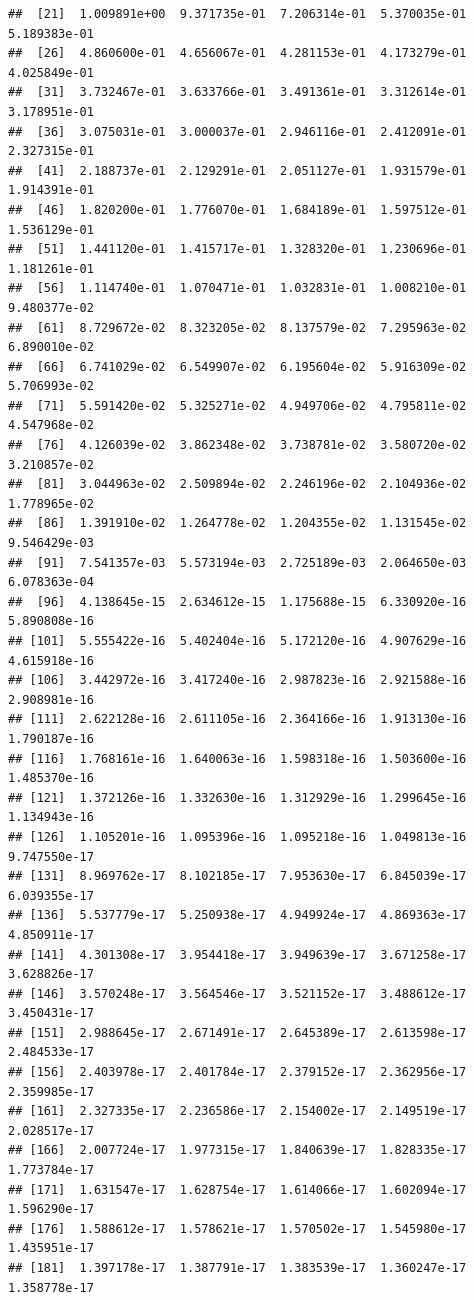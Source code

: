 \documentclass[]{article}
\begin{document}
\begin{verbatim}
##  [21]  1.009891e+00  9.371735e-01  7.206314e-01  5.370035e-01  5.189383e-01
##  [26]  4.860600e-01  4.656067e-01  4.281153e-01  4.173279e-01  4.025849e-01
##  [31]  3.732467e-01  3.633766e-01  3.491361e-01  3.312614e-01  3.178951e-01
##  [36]  3.075031e-01  3.000037e-01  2.946116e-01  2.412091e-01  2.327315e-01
##  [41]  2.188737e-01  2.129291e-01  2.051127e-01  1.931579e-01  1.914391e-01
##  [46]  1.820200e-01  1.776070e-01  1.684189e-01  1.597512e-01  1.536129e-01
##  [51]  1.441120e-01  1.415717e-01  1.328320e-01  1.230696e-01  1.181261e-01
##  [56]  1.114740e-01  1.070471e-01  1.032831e-01  1.008210e-01  9.480377e-02
##  [61]  8.729672e-02  8.323205e-02  8.137579e-02  7.295963e-02  6.890010e-02
##  [66]  6.741029e-02  6.549907e-02  6.195604e-02  5.916309e-02  5.706993e-02
##  [71]  5.591420e-02  5.325271e-02  4.949706e-02  4.795811e-02  4.547968e-02
##  [76]  4.126039e-02  3.862348e-02  3.738781e-02  3.580720e-02  3.210857e-02
##  [81]  3.044963e-02  2.509894e-02  2.246196e-02  2.104936e-02  1.778965e-02
##  [86]  1.391910e-02  1.264778e-02  1.204355e-02  1.131545e-02  9.546429e-03
##  [91]  7.541357e-03  5.573194e-03  2.725189e-03  2.064650e-03  6.078363e-04
##  [96]  4.138645e-15  2.634612e-15  1.175688e-15  6.330920e-16  5.890808e-16
## [101]  5.555422e-16  5.402404e-16  5.172120e-16  4.907629e-16  4.615918e-16
## [106]  3.442972e-16  3.417240e-16  2.987823e-16  2.921588e-16  2.908981e-16
## [111]  2.622128e-16  2.611105e-16  2.364166e-16  1.913130e-16  1.790187e-16
## [116]  1.768161e-16  1.640063e-16  1.598318e-16  1.503600e-16  1.485370e-16
## [121]  1.372126e-16  1.332630e-16  1.312929e-16  1.299645e-16  1.134943e-16
## [126]  1.105201e-16  1.095396e-16  1.095218e-16  1.049813e-16  9.747550e-17
## [131]  8.969762e-17  8.102185e-17  7.953630e-17  6.845039e-17  6.039355e-17
## [136]  5.537779e-17  5.250938e-17  4.949924e-17  4.869363e-17  4.850911e-17
## [141]  4.301308e-17  3.954418e-17  3.949639e-17  3.671258e-17  3.628826e-17
## [146]  3.570248e-17  3.564546e-17  3.521152e-17  3.488612e-17  3.450431e-17
## [151]  2.988645e-17  2.671491e-17  2.645389e-17  2.613598e-17  2.484533e-17
## [156]  2.403978e-17  2.401784e-17  2.379152e-17  2.362956e-17  2.359985e-17
## [161]  2.327335e-17  2.236586e-17  2.154002e-17  2.149519e-17  2.028517e-17
## [166]  2.007724e-17  1.977315e-17  1.840639e-17  1.828335e-17  1.773784e-17
## [171]  1.631547e-17  1.628754e-17  1.614066e-17  1.602094e-17  1.596290e-17
## [176]  1.588612e-17  1.578621e-17  1.570502e-17  1.545980e-17  1.435951e-17
## [181]  1.397178e-17  1.387791e-17  1.383539e-17  1.360247e-17  1.358778e-17

\end{verbatim}
\end{document}

